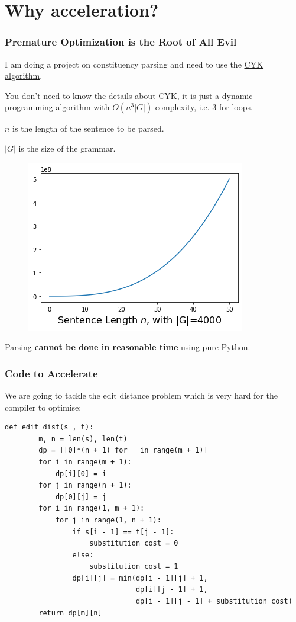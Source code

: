 \documentclass{beamer}
\begin{document}
\section{Why acceleration?}

\begin{frame}
\frametitle{Premature Optimization is the Root of All Evil}
I am doing a project on constituency parsing and need to use the \href{https://en.wikipedia.org/wiki/CYK_algorithm}{CYK algorithm}.
\vspace*{0.3cm}

You don't need to know the details about CYK, it is just a dynamic programming algorithm with  $O(n^3|G|)$ complexity, i.e. 3 for loops.
\vspace*{0.3cm}

{\footnotesize $n$ is the length of the sentence to be parsed.

$|G|$ is the size of the grammar.} \vspace*{0.3cm}\pause

\begin{figure}
\centering
\includegraphics[width=.4\textwidth]{n3G}
\end{figure}

Parsing \textbf{cannot be done in reasonable time} using pure Python. 
\end{frame}

\begin{frame}[fragile]
\frametitle{Code to Accelerate}
We are going to tackle the edit distance problem which is very hard for the compiler to optimise:  

\begin{verbatim}
def edit_dist(s , t):
        m, n = len(s), len(t)
        dp = [[0]*(n + 1) for _ in range(m + 1)]
        for i in range(m + 1):
            dp[i][0] = i 
        for j in range(n + 1):
            dp[0][j] = j
        for i in range(1, m + 1):
            for j in range(1, n + 1):
                if s[i - 1] == t[j - 1]:
                    substitution_cost = 0
                else:
                    substitution_cost = 1
                dp[i][j] = min(dp[i - 1][j] + 1,
                               dp[i][j - 1] + 1,
                               dp[i - 1][j - 1] + substitution_cost)
        return dp[m][n]
\end{verbatim}
\end{frame}
\end{document}
